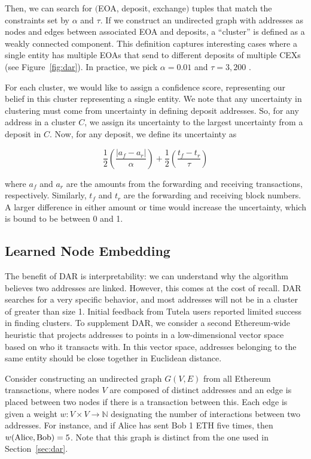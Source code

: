 \documentclass[11pt,a4paper]{article}
\begin{document}
Then, we can search for $($EOA, deposit, exchange$)$ tuples that match the constraints set by $\alpha$ and $\tau$.
If we construct an undirected graph with addresses as nodes and edges between associated EOA and deposits, a ``cluster'' is defined as a weakly connected component. This definition captures interesting cases where a single entity has multiple EOAs that send to different deposits of multiple CEXs (see Figure~\ref{fig:dar}). In practice, we pick $\alpha = 0.01$ and $\tau = 3,200$ \citep{victor2020address}.

For each cluster, we would like to assign a confidence score, representing our belief in this cluster representing a single entity. We note that any uncertainty in clustering must come from uncertainty in defining deposit addresses. So, for any address in a cluster $C$, we assign its uncertainty to the largest uncertainty from a deposit in $C$. Now, for any deposit, we define its uncertainty as

\begin{equation}
\frac{1}{2}\left(\frac{|a_f - a_r|}{\alpha}\right) + \frac{1}{2}\left(\frac{t_f - t_r}{\tau}\right)
\end{equation}

where $a_f$ and $a_r$ are the amounts from the forwarding and receiving transactions, respectively. Similarly, $t_f$ and $t_r$ are the forwarding and receiving block numbers.
A larger difference in either amount or time would increase the uncertainty, which is bound to be between 0 and 1.

\subsection{Learned Node Embedding}

The benefit of DAR is interpretability: we can understand why the algorithm believes two addresses are linked. However, this comes at the cost of recall. DAR searches for a very specific behavior, and most addresses will not be in a cluster of greater than size 1. Initial feedback from Tutela users reported limited success in finding clusters.
To supplement DAR, we consider a second Ethereum-wide heuristic that projects addresses to points in a low-dimensional vector space based on who it transacts with. In this vector space, addresses belonging to the same entity should be close together in Euclidean distance.

Consider constructing an undirected graph $G(V, E)$ from all Ethereum transactions, where nodes $V$ are composed of distinct addresses and an edge is placed between two nodes if there is a transaction between this. Each edge is given a weight $w: V \times V \rightarrow \mathbb{N}$ designating the number of interactions between two addresses. For instance, and if Alice has sent Bob 1 ETH five times,  then $w(\textup{Alice}, \textup{Bob}) = 5$. Note that this graph is distinct from the one used in Section~\ref{sec:dar}.
\end{document}
